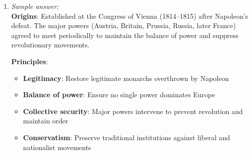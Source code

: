 \documentclass[11pt]{article}
\begin{document}
\begin{enumerate}[label=\textbf{\arabic*.}]
  \textbf{Economic transformation}:
  \begin{itemize}
    \item Shift from agrarian to industrial economy
    \item Factory system replaced cottage industry
    \item Mass production lowered costs, increased output
    \item Expansion of trade and transportation (railroads, steamships)
  \end{itemize}

  \textbf{Social consequences}:
  \begin{itemize}
    \item Urbanization: mass migration to cities (Manchester, Birmingham)
    \item Emergence of industrial working class with poor conditions (long hours, child labor, unsafe factories)
    \item Growth of middle class (factory owners, merchants, professionals)
    \item Social problems: overcrowding, disease, pollution
  \end{itemize}

  \textbf{Political effects}:
  \begin{itemize}
    \item Rise of labor movements and trade unions demanding reforms
    \item Emergence of socialist ideologies (Marx, Engels)
    \item Reform legislation: Factory Acts limiting work hours, improving conditions
    \item Extension of suffrage as industrial workers gained political voice
  \end{itemize}

  \item \emph{Sample answer:}\\
  \textbf{Origins}: Established at the Congress of Vienna (1814--1815) after Napoleon's defeat. The 
  major powers (Austria, Britain, Prussia, Russia, later France) agreed to meet periodically to 
  maintain the balance of power and suppress revolutionary movements.

  \textbf{Principles}:
  \begin{itemize}
    \item \textbf{Legitimacy}: Restore legitimate monarchs overthrown by Napoleon
    \item \textbf{Balance of power}: Ensure no single power dominates Europe
    \item \textbf{Collective security}: Major powers intervene to prevent revolution and maintain order
    \item \textbf{Conservatism}: Preserve traditional institutions against liberal and nationalist movements
  \end{itemize}


\end{enumerate}
\end{document}
